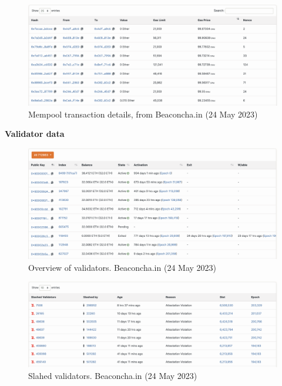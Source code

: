\documentclass[UTF8]{article}
\begin{document}
\begin{figure}[htbp]
\begin{center}
\includegraphics[width=0.9\linewidth]{images/bmempool}
\caption{Mempool transaction details, from Beaconcha.in (24 May 2023)}
\label{fig:bmempool}
\end{center}
\end{figure}
\clearpage


\textbf{Validator data}
\begin{figure}[htbp]
\begin{center}
\includegraphics[width=0.9\linewidth]{images/bvalidators}
\caption{Overview of validators. Beaconcha.in (24 May 2023)}
\label{fig:bvalidators}
\end{center}
\end{figure}

\begin{figure}[htbp]
\begin{center}
\includegraphics[width=0.9\linewidth]{images/bslashed}
\caption{Slahed validators. Beaconcha.in (24 May 2023)}
\label{fig:bslashed}
\end{center}
\end{figure}
\end{document}
